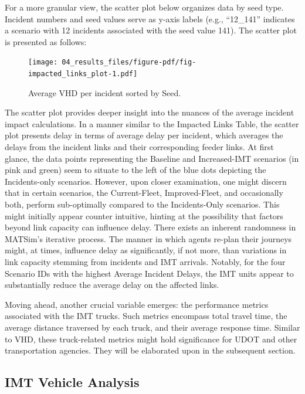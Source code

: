 \documentclass[
  letterpaper,
  authoryear]{elsarticle}
\begin{document}
For a more granular view, the scatter plot below organizes data by seed
type. Incident numbers and seed values serve as y-axis labels (e.g.,
``12\_141'' indicates a scenario with 12 incidents associated with the
seed value 141). The scatter plot is presented as follows:

\begin{figure}

{\centering \texttt{[image: 04\_results\_files/figure-pdf/fig-impacted\_links\_plot-1.pdf]}

}

\caption{\label{fig-impacted_links_plot}Average VHD per incident sorted
by Seed.}

\end{figure}

The scatter plot provides deeper insight into the nuances of the average
incident impact calculations. In a manner similar to the Impacted Links
Table, the scatter plot presents delay in terms of average delay per
incident, which averages the delays from the incident links and their
corresponding feeder links. At first glance, the data points
representing the Baseline and Increased-IMT scenarios (in pink and
green) seem to situate to the left of the blue dots depicting the
Incidents-only scenarios. However, upon closer examination, one might
discern that in certain scenarios, the Current-Fleet, Improved-Fleet,
and occasionally both, perform sub-optimally compared to the
Incidents-Only scenarios. This might initially appear counter intuitive,
hinting at the possibility that factors beyond link capacity can
influence delay. There exists an inherent randomness in MATSim's
iterative process. The manner in which agents re-plan their journeys
might, at times, influence delay as significantly, if not more, than
variations in link capacity stemming from incidents and IMT arrivals.
Notably, for the four Scenario IDs with the highest Average Incident
Delays, the IMT units appear to substantially reduce the average delay
on the affected links.

Moving ahead, another crucial variable emerges: the performance metrics
associated with the IMT trucks. Such metrics encompass total travel
time, the average distance traversed by each truck, and their average
response time. Similar to VHD, these truck-related metrics might hold
significance for UDOT and other transportation agencies. They will be
elaborated upon in the subsequent section.

\hypertarget{imt-vehicle-analysis}{%
\subsection{IMT Vehicle Analysis}\label{imt-vehicle-analysis}}
\end{document}
